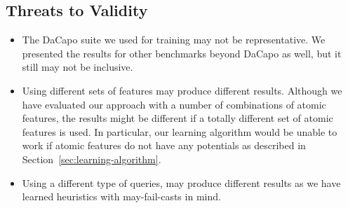 
\subsection{Threats to Validity}
\begin{itemize}
  \item The DaCapo suite we used for training may not be representative. We presented the results for other benchmarks beyond DaCapo as well, but it still may not be inclusive. %

  \item Using different sets of features may produce different results. Although we have evaluated our approach with a number of combinations of atomic features, the results might be different if a totally different set of atomic features is used. In particular, our learning algorithm would be unable to work if atomic features do not have any potentials as described in Section~\ref{sec:learning-algorithm}. %

  \item Using a different type of queries, may produce different results as we have learned heuristics with may-fail-casts in mind. %


\end{itemize}
